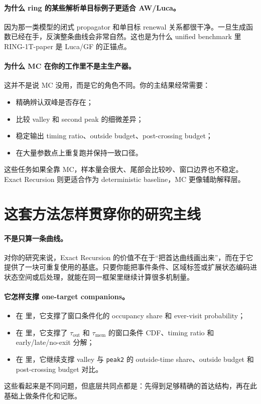 \documentclass[11pt,fontset=fandol]{ctexart}
\begin{document}
\paragraph{为什么 ring 的某些解析单目标例子更适合 AW/Luca。}
因为那一类模型的闭式 propagator 和单目标 renewal 关系都很干净。一旦生成函数已经在手，反演整条曲线会非常自然。这也是为什么 unified benchmark 里 RING-1T-paper 是 Luca/GF 的正锚点。

\paragraph{为什么 MC 在你的工作里不是主生产器。}
这并不是说 MC 没用，而是它的角色不同。你的主结果经常需要：
\begin{itemize}
  \item 精确辨认双峰是否存在；
  \item 比较 valley 和 second peak 的细微差异；
  \item 稳定输出 timing ratio、outside budget、post-crossing budget；
  \item 在大量参数点上重复跑并保持一致口径。
\end{itemize}
这些任务如果全靠 MC，样本量会很大、尾部会比较吵、窗口边界也不稳定。Exact Recursion 则更适合作为 deterministic baseline，MC 更像辅助解释层。

\section{这套方法怎样贯穿你的研究主线}
\paragraph{不是只算一条曲线。}
对你的研究来说，Exact Recursion 的价值不在于“把首达曲线画出来”，而在于它提供了一块可重复使用的基底。只要你能把事件条件、区域标签或扩展状态编码进状态空间或后处理，就能在同一框架里继续计算很多机制量。

\paragraph{它怎样支撑 one-target companions。}
\begin{itemize}
  \item 在  里，它支撑了窗口条件化的 occupancy share 和 ever-visit probability；
  \item 在  里，它支撑了 $\tau_{\mathrm{out}}$ 和 $\tau_{\mathrm{mem}}$ 的窗口条件 CDF、timing ratio 和 early/late/no-exit 分解；
  \item 在  里，它继续支撑 valley 与 \texttt{peak2} 的 outside-time share、outside budget 和 post-crossing budget 对比。
\end{itemize}
这些看起来是不同问题，但底层共同点都是：先得到足够精确的首达结构，再在此基础上做条件化和记账。
\end{document}
